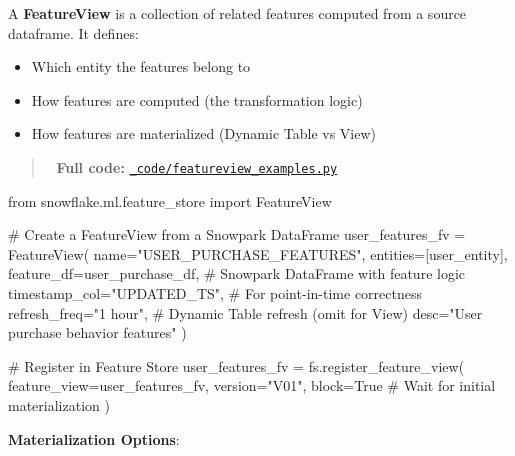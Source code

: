 \documentclass[
  letterpaper,
  DIV=11,
  numbers=noendperiod]{scrreprt}
\newenvironment{Shaded}{\begin{snugshade}}{\end{snugshade}}
\newcommand{\CommentTok}[1]{\textcolor[rgb]{0.37,0.37,0.37}{#1}}
\newcommand{\ImportTok}[1]{\textcolor[rgb]{0.00,0.46,0.62}{#1}}
\newcommand{\NormalTok}[1]{\textcolor[rgb]{0.00,0.23,0.31}{#1}}
\newcommand{\OperatorTok}[1]{\textcolor[rgb]{0.37,0.37,0.37}{#1}}
\newcommand{\StringTok}[1]{\textcolor[rgb]{0.13,0.47,0.30}{#1}}
\newcommand{\VariableTok}[1]{\textcolor[rgb]{0.07,0.07,0.07}{#1}}
\providecommand{\tightlist}{%
  \setlength{\itemsep}{0pt}\setlength{\parskip}{0pt}}\usepackage{longtable,booktabs,array}
\begin{document}
A \textbf{FeatureView} is a collection of related features computed from
a source dataframe. It defines:

\begin{itemize}
\tightlist
\item
  Which entity the features belong to
\item
  How features are computed (the transformation logic)
\item
  How features are materialized (Dynamic Table vs View)
\end{itemize}

\begin{quote}
📁 \textbf{Full code:}
\href{_code/featureview_examples.py}{\texttt{\_code/featureview\_examples.py}}
\end{quote}

\begin{Shaded}
\begin{Highlighting}[]
\ImportTok{from}\NormalTok{ snowflake.ml.feature\_store }\ImportTok{import}\NormalTok{ FeatureView}

\CommentTok{\# Create a FeatureView from a Snowpark DataFrame}
\NormalTok{user\_features\_fv }\OperatorTok{=}\NormalTok{ FeatureView(}
\NormalTok{    name}\OperatorTok{=}\StringTok{"USER\_PURCHASE\_FEATURES"}\NormalTok{,}
\NormalTok{    entities}\OperatorTok{=}\NormalTok{[user\_entity],}
\NormalTok{    feature\_df}\OperatorTok{=}\NormalTok{user\_purchase\_df,  }\CommentTok{\# Snowpark DataFrame with feature logic}
\NormalTok{    timestamp\_col}\OperatorTok{=}\StringTok{"UPDATED\_TS"}\NormalTok{,   }\CommentTok{\# For point{-}in{-}time correctness}
\NormalTok{    refresh\_freq}\OperatorTok{=}\StringTok{"1 hour"}\NormalTok{,        }\CommentTok{\# Dynamic Table refresh (omit for View)}
\NormalTok{    desc}\OperatorTok{=}\StringTok{"User purchase behavior features"}
\NormalTok{)}

\CommentTok{\# Register in Feature Store}
\NormalTok{user\_features\_fv }\OperatorTok{=}\NormalTok{ fs.register\_feature\_view(}
\NormalTok{    feature\_view}\OperatorTok{=}\NormalTok{user\_features\_fv,}
\NormalTok{    version}\OperatorTok{=}\StringTok{"V01"}\NormalTok{,}
\NormalTok{    block}\OperatorTok{=}\VariableTok{True}  \CommentTok{\# Wait for initial materialization}
\NormalTok{)}
\end{Highlighting}
\end{Shaded}

\textbf{Materialization Options}:
\end{document}

